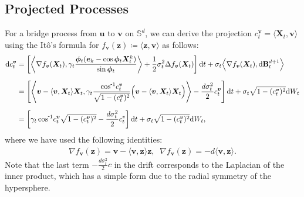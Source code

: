 




\subsection{Projected Processes \label{app:derivation:coord}}

For a bridge process from $\bm{u}$ to $\bm{v}$ on $\mathbb{S}^d$, we can derive the projection $c^{\bm{v}}_t = \langle\bm{X}_t, \bm{v}\rangle$ using the It\^{o}'s formula for $f_{\bm{v}}(\bm{z})\coloneqq \langle \bm{z}, \bm{v} \rangle$ as follows:
\begin{align}
    \mathrm{d}c^{\bm{v}}_t 
    &= \left[ 
        \left\langle 
            \nabla f_{\bm{v}}(\bm{X}_t), 
            \gamma_t \frac{\bm{\phi}_t(\bm{e}_k - \cos\bm{\phi}_t \bm{X}^k_t)}{\sin\bm{\phi}_t}
        \right\rangle 
        + \frac{1}{2}\sigma_t^2 \Delta f_{\bm{v}}(\bm{X}_t) 
    \right] \mathrm{d}t 
    + \sigma_t \Big\langle \nabla f_{\bm{v}}(\bm{X}_t), \mathrm{d}\mathbf{B}^{d+1}_t \Big \rangle \\[6pt]
    &= \left[ 
        \left\langle 
            \bm{v} - \langle\bm{v}, \bm{X}_t\rangle\bm{X}_t, 
            \gamma_t \frac{\invcos\! c^{\bm{v}}_t}{\sqrt{1 - (c^{\bm{v}}_t)^2}} \Big(\bm{v} - \langle\bm{v}, \bm{X}_t\rangle\bm{X}_t \Big) 
        \right\rangle 
        - \frac{d\sigma_t^2}{2}c^{\bm{v}}_t
    \right]\mathrm{d}t + \sigma_t\sqrt{1 - (c^{\bm{v}}_t)^2}\mathrm{d}W_t \\[6pt]
    &= \left[
        \gamma_t \invcos\! c^{\bm{v}}_t \sqrt{1 - (c^{\bm{v}}_t)^2} -\frac{d\sigma_t^2}{2}c^{v}_t
    \right]\mathrm{d}t + \sigma_t\sqrt{1 - (c^{\bm{v}}_t)^2}\mathrm{d}W_t,
\end{align}
where we have used the following identities:
\begin{align}
    \nabla f_{\bm{v}}(\bm{z}) = \bm{v} - \langle \bm{v}, \bm{z} \rangle \bm{z}, \;\; \nabla f_{\bm{v}}(\bm{z}) = -d \langle \bm{v}, \bm{z}\rangle.
\end{align}
Note that the last term $-\frac{d\sigma_t^2}{2}c$ in the drift corresponds to the Laplacian of the inner product, which has a simple form due to the radial symmetry of the hypersphere. 



